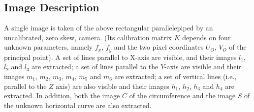 \subsection{Image Description}
A single image is taken of the above rectangular parallelepiped by an uncalibrated, zero
skew, camera. (Its calibration matrix $K$ depends on four unknown parameters, namely $f_x$, $f_y$ and 
the two pixel coordinates $U_O$, $V_O$ of the principal point). A set of lines parallel to X-axis are visible, and their images $l_1$, $l_2$ and $l_3$ are extracted; a set of lines parallel to the $Y$-axis are visible and their images  $m_1$, $m_2$, $m_3$, $m_4$, $m_5$ and $m_6$ are extracted; a set of vertical lines (i.e., parallel to the $Z$
axis) are also visible and their images $h_1$, $h_2$, $h_3$ and $h_4$ are extracted.  In addition, both the image $C$ of the circumference and the image $S$ of the unknown horizontal curve are also extracted.  

